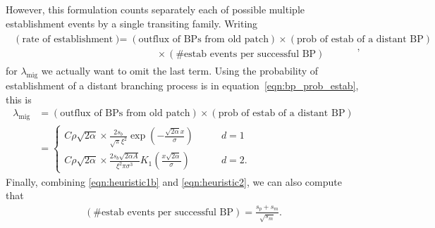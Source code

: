 \documentclass{article}
\newcommand{\migrate}{\lambda_\text{mig}}
\begin{document}
However, this formulation counts separately each of possible multiple establishment events by a single transiting family.
Writing
\begin{align} \label{eqn:heuristic2}
  \begin{split} (\mbox{rate of establishment}) &= (\mbox{outflux of BPs from old patch}) \times (\mbox{prob of estab of a distant BP}) \\
  & \qquad \qquad \times (\mbox{\# estab events per successful BP}) \end{split},
\end{align}
for $\migrate$ we actually want to omit the last term.
Using the probability of establishment of a distant branching process is in equation~\eqref{eqn:bp_prob_estab}, this is
\begin{align}
  \migrate &= (\mbox{outflux of BPs from old patch}) \times (\mbox{prob of estab of a distant BP}) \\
           &= \begin{cases}
    C \rho \sqrt{2 \alpha} \times \frac{2 s_b}{\sqrt{\pi} \xi^2} \exp\left(- \frac{\sqrt{2\alpha}x}{\sigma} \right)  \qquad & d=1 \\
    C \rho \sqrt{2 \alpha} \times \frac{ 2 s_b \sqrt{2 \alpha A} }{ \xi^2 \pi \sigma^3} K_1\left(\frac{x\sqrt{2\alpha}}{\sigma}\right)  \qquad & d=2 .
\end{cases}
\end{align}
Finally, combining \eqref{eqn:heuristic1b} and \eqref{eqn:heuristic2}, we can also compute that
\begin{align}
  (\mbox{\# estab events per successful BP}) = \frac{s_p+s_m}{ \sqrt{s_m} } .
\end{align}
\end{document}
